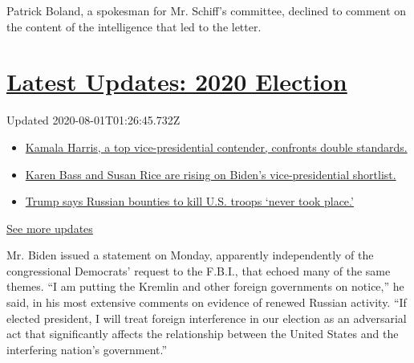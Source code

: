 Patrick Boland, a spokesman for Mr. Schiff's committee, declined to
comment on the content of the intelligence that led to the letter.

\hypertarget{latest-updates-2020-election}{%
\section{\texorpdfstring{\href{https://www.nytimes.com/2020/07/31/us/elections/biden-vs-trump.html?action=click\&pgtype=Article\&state=default\&region=MAIN_CONTENT_1\&context=storylines_live_updates}{Latest
Updates: 2020
Election}}{Latest Updates: 2020 Election}}\label{latest-updates-2020-election}}

Updated 2020-08-01T01:26:45.732Z

\begin{itemize}
\tightlist
\item
  \href{https://www.nytimes.com/2020/07/31/us/elections/biden-vs-trump.html?action=click\&pgtype=Article\&state=default\&region=MAIN_CONTENT_1\&context=storylines_live_updates\#link-29fdff45}{Kamala
  Harris, a top vice-presidential contender, confronts double
  standards.}
\item
  \href{https://www.nytimes.com/2020/07/31/us/elections/biden-vs-trump.html?action=click\&pgtype=Article\&state=default\&region=MAIN_CONTENT_1\&context=storylines_live_updates\#link-13ec3d9c}{Karen
  Bass and Susan Rice are rising on Biden's vice-presidential
  shortlist.}
\item
  \href{https://www.nytimes.com/2020/07/31/us/elections/biden-vs-trump.html?action=click\&pgtype=Article\&state=default\&region=MAIN_CONTENT_1\&context=storylines_live_updates\#link-49e9a016}{Trump
  says Russian bounties to kill U.S. troops `never took place.'}
\end{itemize}

\href{https://www.nytimes.com/2020/07/31/us/elections/biden-vs-trump.html?action=click\&pgtype=Article\&state=default\&region=MAIN_CONTENT_1\&context=storylines_live_updates}{See
more updates}

Mr. Biden issued a statement on Monday, apparently independently of the
congressional Democrats' request to the F.B.I., that echoed many of the
same themes. ``I am putting the Kremlin and other foreign governments on
notice,'' he said, in his most extensive comments on evidence of renewed
Russian activity. ``If elected president, I will treat foreign
interference in our election as an adversarial act that significantly
affects the relationship between the United States and the interfering
nation's government.''

